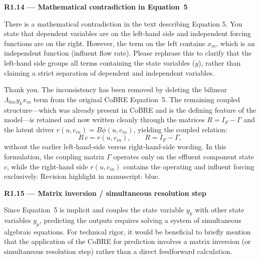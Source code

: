 \documentclass[a4paper,11pt]{article}
\newcommand{\reviewlabel}[1]{\noindent\textbf{\textcolor{accentblue}{#1}}\par\medskip}
\newcommand{\revhighlight}[2]{\textcolor{#1}{Revision highlight in manuscript: #2.}}
\begin{document}
\reviewlabel{R1.14 --- Mathematical contradiction in Equation~5}
\begin{reviewbox}
There is a mathematical contradiction in the text describing Equation 5. You state that dependent variables are on the left-hand side and independent forcing functions are on the right. However, the term on the left contains $x_m$, which is an independent function (influent flow rate). Please rephrase this to clarify that the left-hand side groups all terms containing the state variables ($y$), rather than claiming a strict separation of dependent and independent variables.
\end{reviewbox}

Thank you. The inconsistency has been removed by deleting the bilinear $\Lambda_{km} y_k x_m$ term from the original CoBRE Equation~5. The remaining coupled structure---which was already present in CoBRE and is the defining feature of the model---is retained and now written cleanly through the matrices $R = I_F - \Gamma$ and the latent driver $r(u, c_{in}) = B\phi(u, c_{in})$, yielding the coupled relation:
\[
R\,c = r(u, c_{in}), \qquad R = I_F - \Gamma,
\]
without the earlier left-hand-side versus right-hand-side wording. In this formulation, the coupling matrix $\Gamma$ operates only on the effluent component state $c$, while the right-hand side $r(u, c_{in})$ contains the operating and influent forcing exclusively. \revhighlight{revDefault}{blue}

\reviewlabel{R1.15 --- Matrix inversion / simultaneous resolution step}
\begin{reviewbox}
Since Equation~5 is implicit and couples the state variable $y_k$ with other state variables $y_p$, predicting the outputs requires solving a system of simultaneous algebraic equations. For technical rigor, it would be beneficial to briefly mention that the application of the CoBRE for prediction involves a matrix inversion (or simultaneous resolution step) rather than a direct feedforward calculation.
\end{reviewbox}
\end{document}
